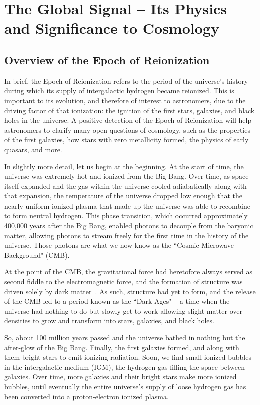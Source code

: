 \chapter{The Global Signal -- Its Physics and Significance to Cosmology}

\section{Overview of the Epoch of Reionization}

In brief, the Epoch of Reionization refers to the period of the universe's 
history during which its supply of intergalactic hydrogen became reionized.  
This is important to its evolution, and therefore of interest to astronomers, 
due to the driving factor of that ionization: the ignition of the first stars, 
galaxies, and black holes in the universe. A positive detection of the Epoch of 
Reionization will help astronomers to clarify many open questions of cosmology, 
such as the properties of the first galaxies, how stars with zero metallicity 
formed, the physics of early quasars, and more.

In slightly more detail, let us begin at the beginning. At the start of time, 
the universe was extremely hot and ionized from the Big Bang. Over time, as 
space itself expanded and the gas within the universe cooled adiabatically 
along with that expansion, the temperature of the universe dropped low enough 
that the nearly uniform ionized plasma that made up the universe was able to 
recombine to form neutral hydrogen. This phase transition, which occurred 
approximately 400,000 years after the Big Bang, enabled photons to decouple 
from the baryonic matter, allowing photons to stream freely for the first time 
in the history of the universe.  Those photons are what we now know as the 
``Cosmic Microwave Background" (CMB).

At the point of the CMB, the gravitational force had heretofore always served 
as second fiddle to the electromagnetic force, and the formation of structure 
was driven solely by dark matter~\citep{zaroubi2012}.  As such, structure had 
yet to form, and the release of the CMB led to a period known as the ``Dark 
Ages" -- a time when the universe had nothing to do but slowly get to work 
allowing slight matter over-densities to grow and transform into stars, 
galaxies, and black holes.

So, about 100 million years passed and the universe bathed in nothing but the 
after-glow of the Big Bang. Finally, the first galaxies formed, and along with 
them bright stars to emit ionizing radiation. Soon, we find small ionized 
bubbles in the intergalactic medium (IGM), the hydrogen gas filling the space 
between galaxies. Over time, more galaxies and their bright stars make more 
ionized bubbles, until eventually the entire universe's supply of loose 
hydrogen gas has been converted into a proton-electron ionized plasma.

